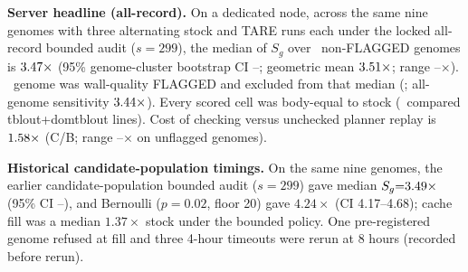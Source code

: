 \documentclass[letterpaper,twocolumn,10pt]{article}
\theoremstyle{definition}
\newcommand{\sys}{TARE\xspace}
\newcommand{\sys}{PARE\xspace}
\begin{document}
\textbf{Server headline (all\nobreakdash-record).} On a dedicated node, across the same nine genomes with three alternating
stock and \sys runs each under the locked all\nobreakdash-record bounded audit ($s{=}299$), the median of $S_g$ over
\HeadlineN\ non\nobreakdash-FLAGGED genomes is $3.47\times$ (95\% genome\nobreakdash-cluster bootstrap CI
\HeadlineCIlow--\HeadlineCIhigh; geometric mean $3.51\times$; range \HeadlineRangeLow--\HeadlineRangeHigh$\times$).
\FlaggedCount\ genome was wall\nobreakdash-quality FLAGGED and excluded from that median (\FlaggedList; all\nobreakdash-genome
sensitivity $3.44\times$). Every scored cell was body\nobreakdash-equal to stock
(\CampaignBodyLines\ compared tblout+domtblout lines). Cost of checking versus unchecked planner replay is
$1.58\times$ (C/B; range \CostOfCheckingRangeLow--\CostOfCheckingRangeHigh$\times$ on unflagged genomes).

\textbf{Historical candidate\nobreakdash-population timings.} On the same nine genomes, the earlier candidate\nobreakdash-population
bounded audit ($s{=}299$) gave median $S_g{=}3.49\times$ (95\% CI \HeadlineBoundedCIlow--\HeadlineBoundedCIhigh),
and Bernoulli ($p{=}0.02$, floor 20) gave $4.24\times$ (CI 4.17--4.68); cache fill was a median $1.37\times$ stock under the
bounded policy. One pre\nobreakdash-registered genome refused at fill and three 4\nobreakdash-hour timeouts were rerun at 8 hours
(recorded before rerun).
\end{document}
